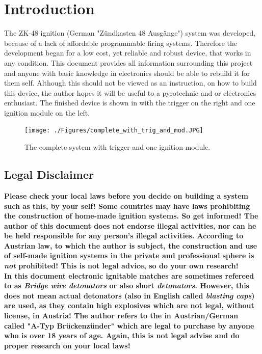 
\section{Introduction}
The ZK-48 ignition (German "Zündkasten 48 Ausgänge") system was developed, because of a lack of affordable  programmable firing systems. Therefore the development began for a low cost, yet reliable and robust device, that works in any condition. This document provides all information surrounding this project and anyone with basic knowledge in electronics should be able to rebuild it for them self. Although this should not be viewed as an instruction, on how to build this device, the author hopes it will be useful to a pyrotechnic and or electronics enthusiast. The finished device is shown in  with the trigger on the right and one ignition module on the left.

\begin{figure}[!ht]
    \centering
    \texttt{[image: ./Figures/complete\_with\_trig\_and\_mod.JPG]}
    \caption{The complete system with trigger and one ignition module.}
    \label{fig:complete_with_trig_and_mod}     
\end{figure}

\subsection{Legal Disclaimer}
\textbf{Please check your local laws before you decide on building a system such as this, by your self! Some countries may have laws prohibiting the construction of home-made ignition systems. So get informed! The author of this document does not endorse illegal activities, nor can he be held responsible for any person's illegal activities. According to Austrian law, to which the author is subject, the construction and use of self-made ignition systems in the private and professional sphere is \textit{not} prohibited! This is not legal advice, so do your own research!}\\

\noindent \textbf{In this document electronic ignitable matches are sometimes refereed to as \textit{Bridge wire detonators} or also short \textit{detonators}. However, this does not mean actual detonators (also in English called \textit{blasting caps}) are used, as they contain high explosives which are not legal, without license, in Austria! The author refers to the in Austrian/German called "A-Typ Brückenzünder" which are legal to purchase by anyone who is over 18 years of age. Again, this is not legal advise and do proper research on your local laws!}

